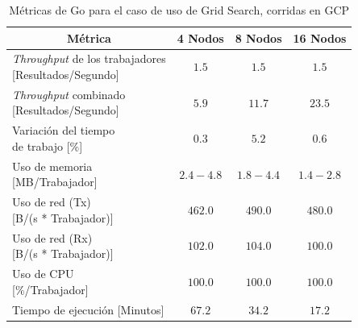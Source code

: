 \documentclass[11pt]{article}
\providecommand{\row}[1]{\parbox{150pt}{\setlength{\baselineskip}{0.2\baselineskip}\strut#1\strut}}
\newcommand{\gscap}[2]{\caption{Métricas de #1 para el caso de uso de Grid Search, corridas en #2}}
\newcommand{\english}[1]{\textit{#1}}
\begin{document}
\begin{table}[H]
\centering
\begin{tabular}{|l|c|c|c|}
\hline
\multicolumn{1}{|c|}{Métrica} & 4 Nodos & 8 Nodos & 16 Nodos \\ \hline
\row{\english{Throughput} de los trabajadores\\{[Resultados/Segundo]}} & $1.5$ & $1.5$ & $1.5$ \\ \hline
\row{\english{Throughput} combinado\\{[Resultados/Segundo]}} & $5.9$ & $11.7$ & $23.5$ \\ \hline
\row{Variación del tiempo\\de trabajo {[\%]}} & $0.3$ & $5.2$ & $0.6$ \\ \hline
\row{Uso de memoria\\{[MB/Trabajador]}} & $2.4-4.8$ & $1.8-4.4$ & $1.4-2.8$ \\ \hline
\row{Uso de red (Tx)\\{[B/(s * Trabajador)]}} & $462.0$ & $490.0$ & $480.0$ \\ \hline
\row{Uso de red (Rx)\\{[B/(s * Trabajador)]}} & $102.0$ & $104.0$ & $100.0$ \\ \hline
\row{Uso de CPU\\{[\%/Trabajador]}} & $100.0$ & $100.0$ & $100.0$ \\ \hline
Tiempo de ejecución [Minutos] & $67.2$ & $34.2$ & $17.2$ \\ \hline
\end{tabular}
\gscap{Go}{GCP}
\end{table}
\end{document}
